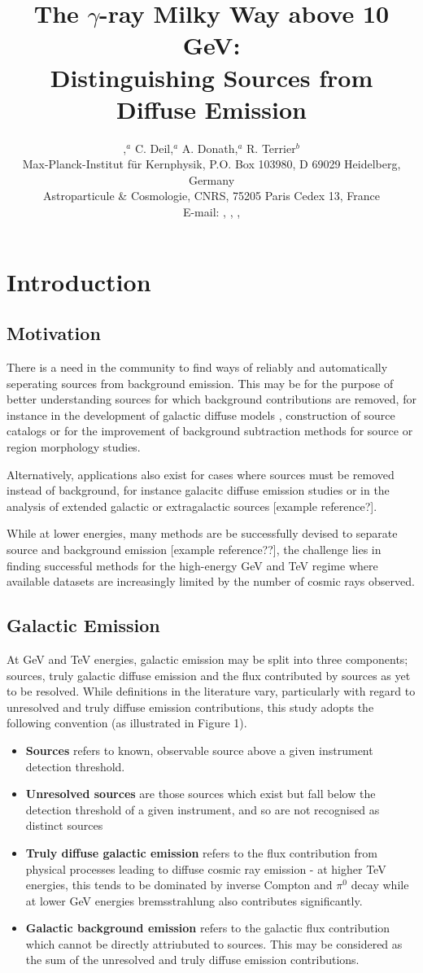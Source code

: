 \documentclass{PoS}
\title{The $\gamma$-ray Milky Way above 10 GeV:\\
Distinguishing Sources from Diffuse Emission}
\author{\speaker{E. Owen},$^a$ C. Deil,$^{a}$ A. Donath,$^{a}$ R. Terrier$^{b}$\\
\llap{$^a$}Max-Planck-Institut f\"{u}r Kernphysik, P.O. Box 103980, D
69029 Heidelberg, Germany\\
\llap{$^b$}Astroparticule \& Cosmologie, CNRS, 75205 Paris Cedex 13, France\\
E-mail: \email{ellis.owen@mpi-hd.mpg.de}, \email{christoph.deil@mpi-hd.mpg.de}, \email{axel.donath@mpi-hd.mpg.de}, \email{terrier@apc.univ-paris7.fr}}
\begin{document}
\section{Introduction}
\subsection{Motivation}
There is a need in the community to find ways of reliably and automatically seperating sources from background emission. This may be for the purpose of better understanding sources for which background contributions are removed, for instance in the development of galactic diffuse models \cite{Fermidiffuse}, construction of source catalogs \cite{1fhl,hgps} or for the improvement of background subtraction methods for source or region morphology studies. 

Alternatively, applications also exist for cases where sources must be removed instead of background, for instance galacitc diffuse emission studies \cite{Egberts} or in the analysis of extended galactic or extragalactic sources [example reference?].

While at lower energies, many methods are be successfully devised to separate source and background emission [example reference??], the challenge lies in finding successful methods for the high-energy GeV and TeV regime where available datasets are increasingly limited by the number of cosmic rays observed.

\subsection{Galactic Emission}
At GeV and TeV energies, galactic emission may be split into three components; sources, truly galactic diffuse emission and the flux contributed by sources as yet to be resolved. While definitions in the literature vary, particularly with regard to unresolved and truly diffuse emission contributions, this study adopts the following convention (as illustrated in Figure 1).
\begin{itemize}
\item{\textbf{Sources} refers to known, observable source above a given instrument detection threshold.}
\item{\textbf{Unresolved sources} are those sources which exist but fall below the detection threshold of a given instrument, and so are not recognised as distinct sources}
\item{\textbf{Truly diffuse galactic emission} refers to the flux contribution from physical processes leading to diffuse cosmic ray emission - at higher TeV energies, this tends to be dominated by inverse Compton and $\pi^0$ decay while at lower GeV energies bremsstrahlung also contributes significantly.}
\item{\textbf{Galactic background emission} refers to the galactic flux contribution which cannot be directly attriubuted to sources. This may be considered as the sum of the unresolved and truly diffuse emission contributions.}
\end{itemize}
\end{document}
